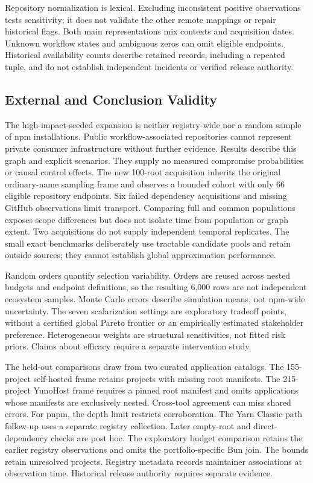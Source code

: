 Repository normalization is lexical. Excluding inconsistent positive observations tests sensitivity; it does not validate the other remote mappings or repair historical flags. Both main representations mix contexts and acquisition dates. Unknown workflow states and ambiguous zeros can omit eligible endpoints. Historical availability counts describe retained records, including a repeated tuple, and do not establish independent incidents or verified release authority.

\subsection{External and Conclusion Validity}
The high-impact-seeded expansion is neither registry-wide nor a random sample of npm installations. Public workflow-associated repositories cannot represent private consumer infrastructure without further evidence. Results describe this graph and explicit scenarios. They supply no measured compromise probabilities or causal control effects.
The new 100-root acquisition inherits the original ordinary-name sampling frame and observes a bounded cohort with only 66 eligible repository endpoints. Six failed dependency acquisitions and missing GitHub observations limit transport. Comparing full and common populations exposes scope differences but does not isolate time from population or graph extent. Two acquisitions do not supply independent temporal replicates. The small exact benchmarks deliberately use tractable candidate pools and retain outside sources; they cannot establish global approximation performance.

Random orders quantify selection variability. Orders are reused across nested budgets and endpoint definitions, so the resulting 6,000 rows are not independent ecosystem samples. Monte Carlo errors describe simulation means, not npm-wide uncertainty. The seven scalarization settings are exploratory tradeoff points, without a certified global Pareto frontier or an empirically estimated stakeholder preference. Heterogeneous weights are structural sensitivities, not fitted risk priors. Claims about efficacy require a separate intervention study.

The held-out comparisons draw from two curated application catalogs. The 155-project self-hosted frame retains projects with missing root manifests. The 215-project YunoHost frame requires a pinned root manifest and omits applications whose manifests are exclusively nested. Cross-tool agreement can miss shared errors. For pnpm, the depth limit restricts corroboration. The Yarn Classic path follow-up uses a separate registry collection. Later empty-root and direct-dependency checks are post hoc. The exploratory budget comparison retains the earlier registry observations and omits the portfolio-specific Bun join. The bounds retain unresolved projects. Registry metadata records maintainer associations at observation time. Historical release authority requires separate evidence.

